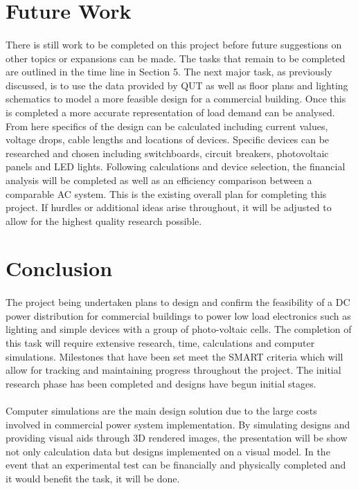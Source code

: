 \section{Future Work}

\paragraph{}
There is still work to be completed on this project before future suggestions on other topics or expansions can be made. The tasks that remain to be completed are outlined in the time line in Section 5. The next major task, as previously discussed, is to use the data provided by QUT as well as floor plans and lighting schematics to model a more feasible design for a commercial building. Once this is completed a more accurate representation of load demand can be analysed. From here specifics of the design can be calculated including current values, voltage drops, cable lengths and locations of devices. Specific devices can be researched and chosen including switchboards, circuit breakers, photovoltaic panels and LED lights. Following calculations and device selection, the financial analysis will be completed as well as an efficiency comparison between a comparable AC system. This is the existing overall plan for completing this project. If hurdles or additional ideas arise throughout, it will be adjusted to allow for the highest quality research possible. 

\newpage 

\section{Conclusion}

\paragraph{}
The project being undertaken plans to design and confirm the feasibility of a DC power distribution for commercial buildings to power low load electronics such as lighting and simple devices with a group of photo-voltaic cells. The completion of this task will require extensive research, time, calculations and computer simulations. Milestones that have been set meet the SMART criteria which will allow for tracking and maintaining progress throughout the project. The initial research phase has been completed and designs have begun initial stages.

\paragraph{}
Computer simulations are the main design solution due to the large costs involved in commercial power system implementation. By simulating designs and providing visual aids through 3D rendered images, the presentation will be show not only calculation data but designs implemented on a visual model. In the event that an experimental test can be financially and physically completed and it would benefit the task, it will be done.    

